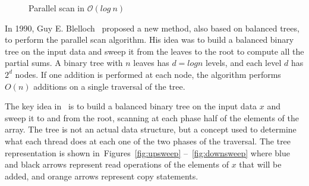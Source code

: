 \documentclass[Ingles]{ic-tese-v1}
\newcommand{\rfigs}[2]{Figures~\ref{fig:#1} --~\ref{fig:#2}}
\begin{document}
\begin{figure}[t]
	\centering
	\caption{Parallel scan in $\mathcal{O}(log\  n)$}
	\vfill
\end{figure}

In 1990, Guy  E. Blelloch~\cite{ScanAsPrimitive} proposed a new method,
also based on balanced trees,  to perform the parallel scan algorithm.
His idea  was to build a balanced binary tree on the input data and sweep
it from the leaves to the root to compute all the partial sums. A binary
tree with $n$ leaves has $d = log n$ levels, and each level $d$ has $2^{d}$
nodes. If one addition is performed at each node, the algorithm  performs
$O(n)$ additions on a single traversal of the tree.

The key  idea in~\cite{ScanAsPrimitive} is  to build a  balanced binary
tree on the input data $x$ and  sweep it to and from the root, scanning
at each phase half  of the elements of the array.  The  tree is not an
actual  data structure,  but a  concept  used to  determine what  each
thread does at each one of the  two phases of the traversal.  The tree
representation is  shown in~\rfigs{upsweep}{downsweep} where  blue and
black arrows  represent read  operations of the  elements of  $x$ that
will be added, and orange arrows represent copy statements.
\end{document}
